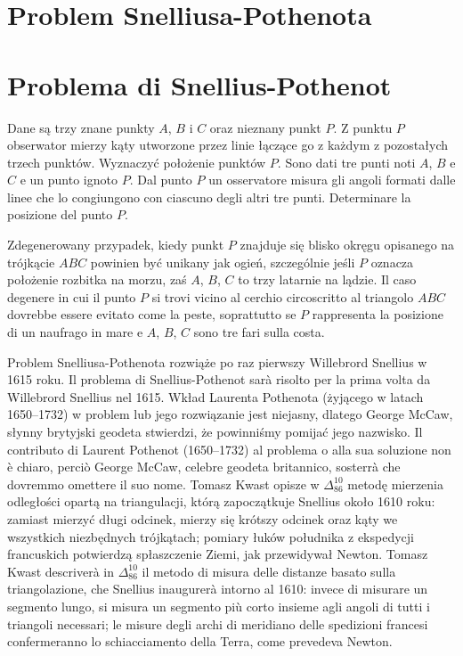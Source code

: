 %

\section{Problem Snelliusa-Pothenota} %
\section{Problema di Snellius-Pothenot} %


\begin{problem}
    Dane są trzy znane punkty $A$, $B$ i $C$ oraz nieznany punkt $P$. %
    Z punktu $P$ obserwator mierzy kąty utworzone przez linie łączące go z każdym z pozostałych trzech punktów. %
    Wyznaczyć położenie punktów $P$. %
    Sono dati tre punti noti $A$, $B$ e $C$ e un punto ignoto $P$. %
    Dal punto $P$ un osservatore misura gli angoli formati dalle linee che lo congiungono con ciascuno degli altri tre punti. %
    Determinare la posizione del punto $P$. %
\end{problem}

Zdegenerowany przypadek, kiedy punkt $P$ znajduje się blisko okręgu opisanego na trójkącie $ABC$ powinien być unikany jak ogień, szczególnie jeśli $P$ oznacza położenie rozbitka na morzu, zaś $A$, $B$, $C$ to trzy latarnie na lądzie. %
Il caso degenere in cui il punto $P$ si trovi vicino al cerchio circoscritto al triangolo $ABC$ dovrebbe essere evitato come la peste, soprattutto se $P$ rappresenta la posizione di un naufrago in mare e $A$, $B$, $C$ sono tre fari sulla costa. %

Problem Snelliusa-Pothenota rozwiąże po raz pierwszy Willebrord Snellius w 1615 roku. %
Il problema di Snellius-Pothenot sarà risolto per la prima volta da Willebrord Snellius nel 1615. %
Wkład Laurenta Pothenota (żyjącego w latach 1650--1732) w problem lub jego rozwiązanie jest niejasny, dlatego George McCaw, słynny brytyjski geodeta stwierdzi, że powinniśmy pomijać jego nazwisko. %
Il contributo di Laurent Pothenot (1650--1732) al problema o alla sua soluzione non è chiaro, perciò George McCaw, celebre geodeta britannico, sosterrà che dovremmo omettere il suo nome. %
Tomasz Kwast opisze w $\Delta_{86}^{10}$ metodę mierzenia odległości opartą na triangulacji, którą zapoczątkuje Snellius około 1610 roku: zamiast mierzyć długi odcinek, mierzy się krótszy odcinek oraz kąty we wszystkich niezbędnych trójkątach; pomiary łuków południka z ekspedycji francuskich potwierdzą spłaszczenie Ziemi, jak przewidywał Newton. %
Tomasz Kwast descriverà in $\Delta_{86}^{10}$ il metodo di misura delle distanze basato sulla triangolazione, che Snellius inaugurerà intorno al 1610: invece di misurare un segmento lungo, si misura un segmento più corto insieme agli angoli di tutti i triangoli necessari; le misure degli archi di meridiano delle spedizioni francesi confermeranno lo schiacciamento della Terra, come prevedeva Newton. %

%